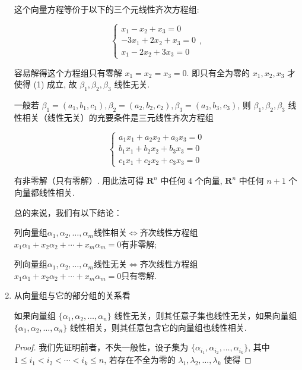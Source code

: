 \begin{enumerate}
\begin{solution}
            这个向量方程等价于以下的三个元线性齐次方程组:

            \[
            \begin{cases}
            x_1 - x_2 + x_3 = 0 \\
            -3x_1 + 2x_2 + x_3 = 0 \\
            x_1 - 2x_2 + 3x_3 = 0
            \end{cases},
            \]

            容易解得这个方程组只有零解 $x_1 = x_2 = x_3 = 0$. 即只有全为零的 $x_1, x_2, x_3$ 才使得 (1) 成立, 故 $\beta_1, \beta_2, \beta_3$ 线性无关.

            一般若 $\beta_1 = (a_1, b_1, c_1), \beta_2 = (a_2, b_2, c_2), \beta_3 = (a_3, b_3, c_3)$, 则 $\beta_1, \beta_2, \beta_3$ 线性相关（线性无关）的充要条件是三元线性齐次方程组

            \[
            \begin{cases}
            a_1 x_1 + a_2 x_2 + a_3 x_3 = 0 \\
            b_1 x_1 + b_2 x_2 + b_3 x_3 = 0 \\
            c_1 x_1 + c_2 x_2 + c_3 x_3 = 0
            \end{cases}
            \]

            有非零解（只有零解）. 用此法可得 $\mathbf{R}^n$ 中任何 4 个向量, $\mathbf{R}^n$ 中任何 $n + 1$ 个向量都线性相关.


          总的来说，我们有以下结论：

          列向量组$\alpha_1,\alpha_2,\ldots,\alpha_m$线性相关$\iff$齐次线性方程组$x_1\alpha_1+x_2\alpha_2+\cdots+x_m\alpha_m=0$有非零解;

          列向量组$\alpha_1,\alpha_2,\ldots,\alpha_m$线性无关$\iff$齐次线性方程组$x_1\alpha_1+x_2\alpha_2+\cdots+x_m\alpha_m=0$只有零解.
         \end{solution}
    \item 从向量组与它的部分组的关系看
          \begin{example}{}{}
            如果向量组 $\{ \alpha_1,\alpha_2,\ldots,\alpha_n \}$ 线性无关，则其任意子集也线性无关，如果向量组 $\{ \alpha_1,\alpha_2,\ldots,\alpha_n \}$ 线性相关，则其任意包含它的向量组也线性相关.
          \end{example}
          \begin{proof}
            我们先证明前者，不失一般性，设子集为 $\{ \alpha_{i_1},\alpha_{i_2},\ldots,\alpha_{i_k} \}$, 其中 $1 \leqslant i_1 < i_2 < \cdots < i_k \leqslant n$, 若存在不全为零的 $\lambda_1,\lambda_2,\ldots,\lambda_k$ 使得


\end{proof}
\end{enumerate}
